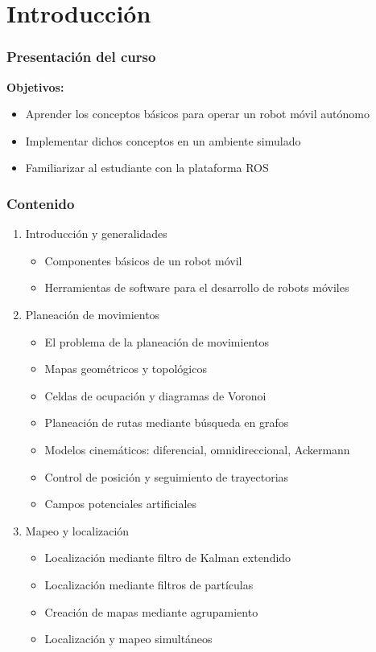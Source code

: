 \section{Introducción}
\begin{frame}\frametitle{Presentación del curso}
  \textbf{Objetivos:}
  \begin{itemize}
  \item Aprender los conceptos básicos para operar un robot móvil autónomo
  \item Implementar dichos conceptos en un ambiente simulado
  \item Familiarizar al estudiante con la plataforma ROS
  \end{itemize}
\end{frame}

\begin{frame}\frametitle{Contenido}
  \begin{enumerate}
  \item Introducción y generalidades
    \begin{itemize}
    \item Componentes básicos de un robot móvil
    \item Herramientas de software para el desarrollo de robots móviles
    \end{itemize}
  \item Planeación de movimientos
    \begin{itemize}
    \item El problema de la planeación de movimientos
    \item Mapas geométricos y topológicos
    \item Celdas de ocupación y diagramas de Voronoi
    \item Planeación de rutas mediante búsqueda en grafos
    \item Modelos cinemáticos: diferencial, omnidireccional, Ackermann
    \item Control de posición y seguimiento de trayectorias
    \item Campos potenciales artificiales
    \end{itemize}
  \item Mapeo y localización
    \begin{itemize}
    \item Localización mediante filtro de Kalman extendido
    \item Localización mediante filtros de partículas
    \item Creación de mapas mediante agrupamiento
    \item Localización y mapeo simultáneos
    \end{itemize}
  \end{enumerate}
\end{frame}

